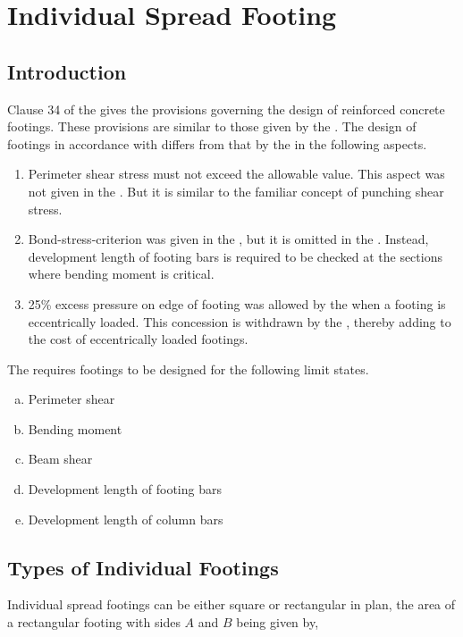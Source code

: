 \chapter{Individual Spread Footing}
\section{Introduction} Clause 34 of the   gives the
provisions governing the design of reinforced concrete footings.  These
provisions are similar to those given by the \citeauthor{aci1981aci}. 
The design of footings in accordance with  differs
from that by the  in the following aspects.

\begin{enumerate}[I]
\item Perimeter shear stress must not exceed the allowable value. This
aspect was not given in the . But it is similar to
the familiar concept of punching shear stress.

\item Bond-stress-criterion was given in the , but it
is omitted in the . Instead, development length of
footing bars is required to be checked at the sections where bending
moment is critical.

\item 25\% excess pressure on edge of footing was allowed by the 
 when a footing is eccentrically loaded. This 
concession is withdrawn by the , thereby adding to 
the cost of eccentrically loaded footings.
\end{enumerate}
The  requires footings to be designed for the following limit states.

\begin{enumerate}[(a)]
\item Perimeter shear
\item Bending moment
\item Beam shear
\item Development length of footing bars
\item Development length of column bars
\end{enumerate}

\section{Types of Individual Footings} Individual spread footings can be
either square or rectangular in plan, the area of a rectangular footing
with sides $A$ and $B$ being given by,

